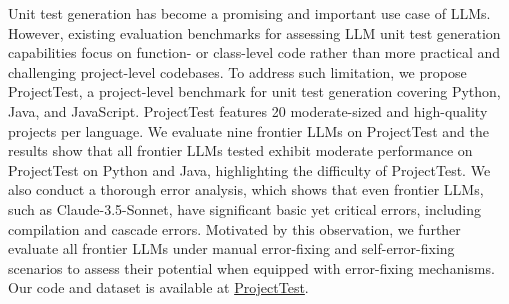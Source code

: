 Unit test generation has become a promising and important use case of LLMs. However, existing evaluation benchmarks for assessing LLM unit test generation capabilities focus on function- or class-level code rather than more practical and challenging project-level codebases.
To address such limitation, we propose ProjectTest, a project-level benchmark for unit test generation covering Python, Java, and JavaScript. ProjectTest features 20 moderate-sized and high-quality projects per language. We evaluate nine frontier LLMs on ProjectTest and the results show that all frontier LLMs tested exhibit moderate performance on ProjectTest on Python and Java, 
highlighting the difficulty of ProjectTest.
We also conduct a thorough error analysis, which shows that even frontier LLMs, such as Claude-3.5-Sonnet, have significant basic yet critical errors, including compilation and cascade errors. Motivated by this observation, we further evaluate all frontier LLMs under manual error-fixing and self-error-fixing scenarios to assess their potential when equipped with error-fixing mechanisms.
Our code and dataset is available at \href{https://github.com/YiboWANG214/ProjectTest}{ProjectTest}.
